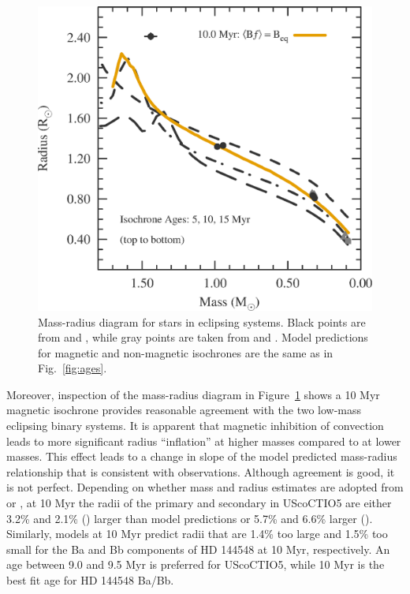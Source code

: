 \documentclass{aa}
\begin{document}
\begin{figure}[t]
    \centering
    \includegraphics[width=0.90\linewidth]{USCO5_MR.eps}
    \caption{Mass-radius diagram for stars in eclipsing systems. Black points are from \citet{Kraus2015} and \citet{Alonso2015}, while gray points are taken from \citet{Lodieu2015} and \citet{David2016}. Model predictions for magnetic and non-magnetic isochrones are the same as in Fig.~\ref{fig:ages}.}
    \label{fig:mrd}
\end{figure}

Moreover, inspection of the mass-radius diagram in Figure~\ref{fig:mrd} shows a 10 Myr magnetic isochrone provides reasonable agreement with the two low-mass eclipsing binary systems. It is apparent that magnetic inhibition of convection leads to more significant radius ``inflation'' at higher masses compared to at lower masses. This effect leads to a change in slope of the model predicted mass-radius relationship that is consistent with observations. Although agreement is good, it is not perfect. Depending on whether mass and radius estimates are adopted from \citet{Kraus2015} or \citet{David2016}, at 10 Myr the radii of the primary and secondary in UScoCTIO5 are either 3.2\% and 2.1\% (\citeauthor{Kraus2015}) larger than model predictions or 5.7\% and 6.6\% larger (\citeauthor{David2016}). Similarly, models at 10 Myr predict radii that are 1.4\% too large and 1.5\% too small for the Ba and Bb components of HD 144548 at 10 Myr, respectively. An age between 9.0 and 9.5 Myr is preferred for UScoCTIO5, while 10 Myr is the best fit age for HD 144548 Ba/Bb. 
\end{document}
